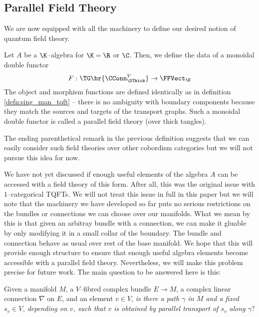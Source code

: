 
\subsection{Parallel Field Theory}

We are now equipped with all the machinery to define our desired notion of
quantum field theory.

\begin{defn}
Let $A$ be a $\K$--algebra for $\K = \R$ or $\C$. Then, we define the data of a
monoidal double functor
\[
  F : \TG\br{\CConn^V_{\DThick}} \to \FFVect_{\K}
\]
The object and morphism functions are defined identically as in definition
\ref{defn:sing_man_tqft} -- there is no ambiguity with boundary components
because they match the sources and targets of the transport graphs. Such a
monoidal double functor is called a parallel field theory (over thick tangles).
\end{defn}

\begin{rmk}
The ending parenthetical remark in the previous definition suggests that we can
easily consider such field theories over other cobordism categories but we will
not pursue this idea for now.
\end{rmk}

We have not yet discussed if enough useful elements of the algebra $A$ can be
accessed with a field theory of this form. After all, this was the original
issue with $1$--categorical TQFTs. We will not treat this issue in full in this
paper but we will note that the machinery we have developed so far puts no
serious restrictions on the bundles or connections we can choose over our
manifolds. What we mean by this is that given an arbitray bundle with a
connection, we can make it gluable by only modifying it in a small collar of the
boundary. The bundle and connection behave as usual over rest of the base
manifold. We hope that this will provide enough structure to ensure that enough
useful algebra elements become accessible with a parallel field theory.
Nevertheless, we will make this problem precise for future work.
The main question to be answered here is this:
\begin{displayquote}
Given a manifold $M$, a $V$--fibred
complex bundle $E \to M$, a complex linear connection $\nabla$ on $E$, and an
element $v \in V$, \textit{is there a path $\gamma$ in $M$ and a fixed
$s_v \in V$, depending on $v$, such that $v$ is obtained by parallel transport
of $s_v$ along $\gamma$}?
\end{displayquote}



